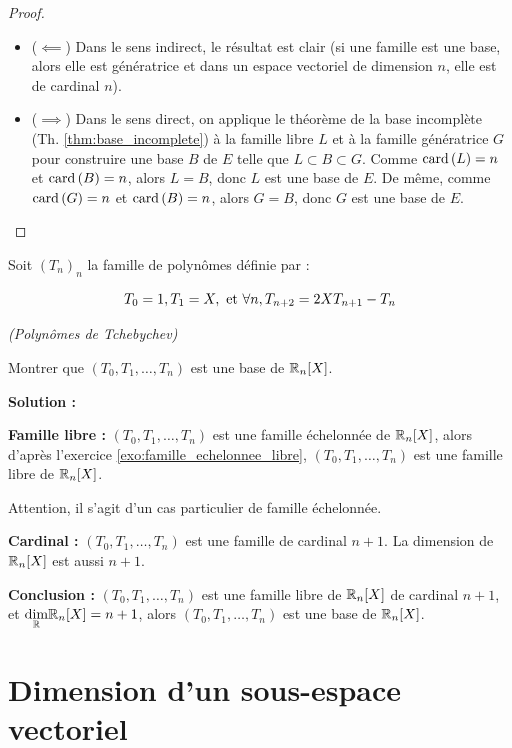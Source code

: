 \documentclass[12pt, a4paper]{report}
\begin{document}
\begin{proof}
    \begin{itemize}
        \item ($\impliedby$) Dans le sens indirect, le résultat est clair (si une famille est une base, alors elle est génératrice et dans un espace vectoriel de dimension $n$, elle est de cardinal $n$).
        \item ($\implies$) Dans le sens direct, on applique le théorème de la base incomplète (Th. \ref{thm:base_incomplete}) à la famille libre $L$ et à la famille génératrice $G$ pour construire une base $B$ de $E$ telle que $L \subset B \subset G$. Comme $\mathrm{card}\left(L\right) = n$ et $\mathrm{card}\left(B\right) = n$, alors $L = B$, donc $L$ est une base de $E$. De même, comme $\mathrm{card}\left(G\right) = n$ et $\mathrm{card}\left(B\right) = n$, alors $G = B$, donc $G$ est une base de $E$.
    \end{itemize}
\end{proof}

\begin{exercise}
    Soit $(T_n)_n$ la famille de polynômes définie par :

    $$T_0 = 1, T_1 = X, \text{ et } \forall n, T_{n+2} = 2XT_{n+1} - T_n$$

    \textit{(Polynômes de Tchebychev)}

    Montrer que $(T_0,T_1,\dots,T_n)$ est une base de $\mathbb{R}_n[X]$.

    \textbf{Solution :}

    \begin{outline}        
        \1 \textbf{Famille libre :} $(T_0,T_1,\dots,T_n)$ est une famille échelonnée de $\mathbb{R}_n[X]$, alors d'après l'exercice \ref{exo:famille_echelonnee_libre}, $(T_0,T_1,\dots,T_n)$ est une famille libre de $\mathbb{R}_n[X]$.

        \2 Attention, il s'agit d'un cas particulier de famille échelonnée.

        \1 \textbf{Cardinal :} $(T_0,T_1,\dots,T_n)$ est une famille de cardinal $n+1$. La dimension de $\mathbb{R}_n[X]$ est aussi $n+1$.

        \1 \textbf{Conclusion :} $(T_0,T_1,\dots,T_n)$ est une famille libre de $\mathbb{R}_n[X]$ de cardinal $n+1$, et $\underset{\mathbb{R}}\dim \mathbb{R}_n[X] = n+1$, alors $(T_0,T_1,\dots,T_n)$ est une base de $\mathbb{R}_n[X]$.
    \end{outline}
\end{exercise}

\section{Dimension d'un sous-espace vectoriel}
\end{document}
